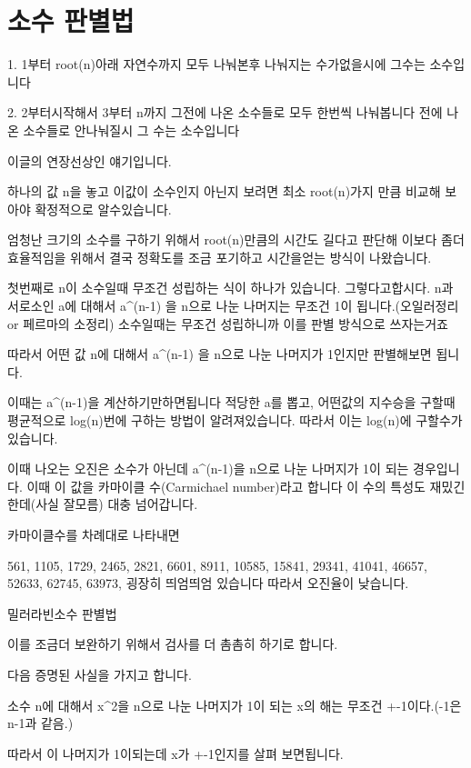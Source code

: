 \section{소수 판별법}



1. 1부터 root(n)아래 자연수까지 모두 나눠본후 나눠지는 수가없을시에 그수는 소수입니다

2. 2부터시작해서 3부터 n까지 그전에 나온 소수들로 모두 한번씩 나눠봅니다 전에 나온 소수들로 안나눠질시 그 수는 소수입니다



이글의 연장선상인 얘기입니다.

하나의 값 n을 놓고 이값이 소수인지 아닌지 보려면 최소 root(n)가지 만큼 비교해 보아야 확정적으로 알수있습니다.

엄청난 크기의 소수를 구하기 위해서 root(n)만큼의 시간도 길다고 판단해
이보다 좀더 효율적임을 위해서 결국 정확도를 조금 포기하고 시간을얻는 방식이 나왔습니다.

첫번째로 n이 소수일때 무조건 성립하는 식이 하나가 있습니다. 그렇다고합시다.
n과 서로소인 a에 대해서 a^(n-1) 을 n으로 나눈 나머지는 무조건 1이 됩니다.(오일러정리 or 페르마의 소정리)
소수일때는 무조건 성립하니까 이를 판별 방식으로 쓰자는거죠


따라서 어떤 값 n에 대해서 a^(n-1) 을 n으로 나눈 나머지가 1인지만 판별해보면 됩니다.

이때는  a^(n-1)을 계산하기만하면됩니다 
적당한 a를 뽑고,
어떤값의 지수승을 구할때 평균적으로 log(n)번에 구하는 방법이 알려져있습니다. 따라서 이는 log(n)에 구할수가있습니다.

이때 나오는 오진은 소수가 아닌데 a^(n-1)을 n으로 나눈 나머지가 1이 되는 경우입니다.
이때 이 값을 카마이클 수(Carmichael number)라고 합니다 이 수의 특성도 재밌긴한데(사실 잘모름) 대충 넘어갑니다.

카마이클수를 차례대로 나타내면

561, 1105, 1729, 2465, 2821, 6601, 8911, 10585, 15841, 29341, 41041, 46657, 52633, 62745, 63973, 
굉장히 띄엄띄엄 있습니다 따라서 오진율이 낮습니다.


밀러라빈소수 판별법

이를 조금더 보완하기 위해서 검사를 더 촘촘히 하기로 합니다.

다음 증명된 사실을 가지고 합니다.

소수 n에 대해서 
x^2을 n으로 나눈 나머지가 1이 되는 x의 해는 무조건 +-1이다.(-1은 n-1과 같음.) 

따라서 이 나머지가 1이되는데 x가 +-1인지를 살펴 보면됩니다.


